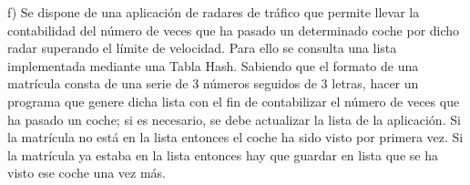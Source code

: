 {\color[rgb]{1,0,0}
f) Se dispone de una aplicación de radares de tráfico que
permite llevar la contabilidad del número de veces que
ha pasado un determinado coche por dicho radar superando
el límite de velocidad. Para ello se consulta una lista
implementada mediante una Tabla Hash. Sabiendo que el
formato de una matrícula consta de una serie de 3 números
seguidos de 3 letras, hacer un programa que genere dicha
lista con el fin de contabilizar el número de veces que
ha pasado un coche; si es necesario, se debe actualizar la
lista de la aplicación. Si la matrícula no está en la lista
entonces el coche ha sido visto por primera vez. Si la
matrícula ya estaba en la lista entonces hay que guardar en
lista que se ha visto ese coche una vez más.
}